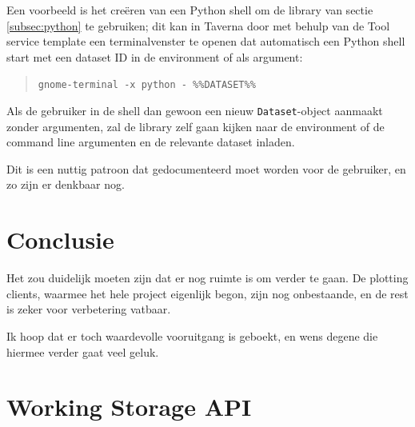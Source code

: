 \documentclass[a4paper]{article}
\begin{document}
Een voorbeeld is het cre\"eren van een Python shell om de library van sectie
\ref{subsec:python} te gebruiken; dit kan in Taverna door met behulp van de
Tool service template een terminalvenster te openen dat automatisch een Python
shell start met een dataset ID in de environment of als argument:

\begin{quote}
    {\tt gnome-terminal -x python - \%\%DATASET\%\%}
\end{quote}

Als de gebruiker in de shell dan gewoon een nieuw {\tt Dataset}-object aanmaakt
zonder argumenten, zal de library zelf gaan kijken naar de environment of de
command line argumenten en de relevante dataset inladen.

Dit is een nuttig patroon dat gedocumenteerd moet worden voor de gebruiker, en
zo zijn er denkbaar nog.

\newpage

\section{Conclusie}

Het zou duidelijk moeten zijn dat er nog ruimte is om verder te gaan. De
plotting clients, waarmee het hele project eigenlijk begon, zijn nog
onbestaande, en de rest is zeker voor verbetering vatbaar.

Ik hoop dat er toch waardevolle vooruitgang is geboekt, en wens degene die
hiermee verder gaat veel geluk.

\newpage

\appendix
\section{Working Storage \gls{API}}
\label{app:storage}
\end{document}
